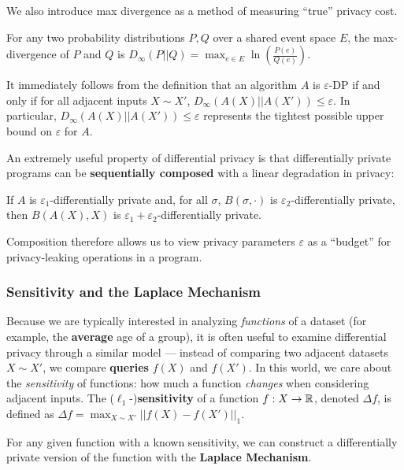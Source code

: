 We also introduce max divergence as a method of measuring ``true'' privacy cost. 

\begin{defn}
    For any two probability distributions $P, Q$ over a shared event space $E$, the max-divergence of $P$ and $Q$ is 
    $D_{\infty}(P||Q) = \max_{e\in E}\ln\left(\frac{P(e)}{Q(e)}\right)$.
\end{defn}

It immediately follows from the definition that an algorithm $A$ is $\varepsilon$-DP if and only if for all adjacent inputs $X\sim X'$, $D_{\infty}(A(X)||A(X'))\leq \varepsilon$. In particular, $D_{\infty}(A(X)||A(X'))\leq \varepsilon$ represents the tightest possible upper bound on $\varepsilon$ for $A$. 

An extremely useful property of differential privacy is that differentially private programs can be \textbf{sequentially composed} with a linear degradation in privacy:

\begin{thm}
    If $A$ is $\varepsilon_1$-differentially private and, for all $\sigma$, $B(\sigma, \cdot)$ is $\varepsilon_2$-differentially private, then $B(A(X), X)$ is $\varepsilon_1+\varepsilon_2$-differentially private. 
\end{thm}

Composition therefore allows us to view privacy parameters $\varepsilon$ as a ``budget'' for privacy-leaking operations in a program. 

\subsubsection{Sensitivity and the Laplace Mechanism}

Because we are typically interested in analyzing \textit{functions} of a dataset (for example, the \textbf{average} age of a group), it is often useful to examine differential privacy through a similar model --- instead of comparing two adjacent datasets $X\sim X'$, we compare \textbf{queries} $f(X)$ and $f(X')$. In this world, we care about the \textit{sensitivity} of functions: how much a function \textit{changes} when considering adjacent inputs. 
The ($\ell_1$-)\textbf{sensitivity} of a function $f: X\to \mathbb{R}$, denoted $\Delta f$, is defined as $\Delta f = \max_{X\sim X'}||f(X)-f(X')||_1$.

For any given function with a known sensitivity, we can construct a differentially private version of the function with the \textbf{Laplace Mechanism}. 

